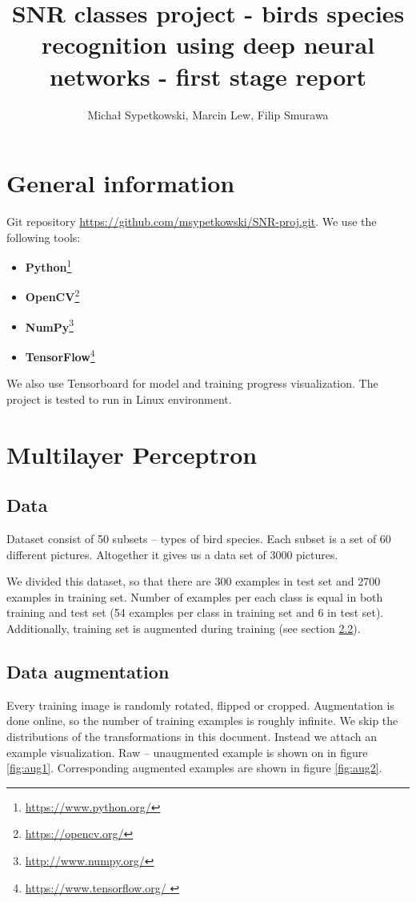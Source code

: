 ﻿\documentclass[a4paper]{article}
\begin{document}
\title{SNR classes project - birds species recognition using deep neural networks
- first stage report}

\author{Michał Sypetkowski, Marcin Lew, Filip Smurawa}
\maketitle

\section{General information}
Git repository \url{https://github.com/msypetkowski/SNR-proj.git}.
We use the following tools:
\begin{itemize}
    \item \textbf{Python}\footnote{\url{https://www.python.org/}}
    \item \textbf{OpenCV}\footnote{\url{https://opencv.org/}}
    \item \textbf{NumPy}\footnote{\url{http://www.numpy.org/}}
    \item \textbf{TensorFlow}\footnote{\url{https://www.tensorflow.org/ }}
\end{itemize}
We also use Tensorboard for model and training progress visualization.
The project is tested to run in Linux environment.

\section{Multilayer Perceptron}

\subsection{Data}
Dataset consist of 50 subsets -- types of bird species.
Each subset is a set of 60 different pictures.
Altogether it gives us a data set of 3000 pictures.

We divided this dataset, so that there are 300 examples in test set and
2700 examples in training set.
Number of examples per each class is equal in both training and test set
(54 examples per class in training set and 6 in test set).
Additionally, training set is augmented during training (see section \ref{augmentation}).


\subsection{Data augmentation}
\label{augmentation}
Every training image is randomly rotated, flipped or cropped.
Augmentation is done online, so the number of training examples is
roughly infinite.
We skip the distributions of the transformations in this document.
Instead we attach an example visualization.
Raw -- unaugmented example is shown on in figure \ref{fig:aug1}.
Corresponding augmented examples are shown in figure \ref{fig:aug2}.
\end{document}
